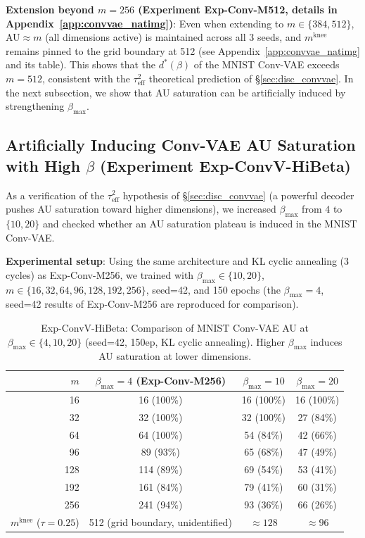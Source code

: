 \documentclass[make,article,submit,pdftex,moreauthors]{Definitions/mdpi}
\newcommand{\mknee}{m^{\mathrm{knee}}}
\begin{document}
\textbf{Extension beyond $m=256$ (Experiment Exp-Conv-M512, details in Appendix~\ref{app:convvae_natimg})}:
Even when extending to $m \in \{384, 512\}$, AU$\approx m$ (all dimensions active) is maintained across
all 3 seeds, and $\mknee$ remains pinned to the grid boundary at 512
(see Appendix~\ref{app:convvae_natimg} and its table).
This shows that the $d^*(\beta)$ of the MNIST Conv-VAE exceeds $m=512$,
consistent with the $\tau^2_\mathrm{eff}$ theoretical prediction of \S\ref{sec:disc_convvae}.
In the next subsection, we show that AU saturation can be artificially induced by strengthening $\beta_{\max}$.

\subsection{Artificially Inducing Conv-VAE AU Saturation with High $\beta$ (Experiment Exp-ConvV-HiBeta)}\label{sec:exp_hibeta}

As a verification of the $\tau^2_\mathrm{eff}$ hypothesis of \S\ref{sec:disc_convvae}
(a powerful decoder pushes AU saturation toward higher dimensions),
we increased $\beta_{\max}$ from $4$ to $\{10, 20\}$ and checked whether an AU saturation plateau
is induced in the MNIST Conv-VAE.

\textbf{Experimental setup}: Using the same architecture and KL cyclic annealing (3 cycles) as Exp-Conv-M256,
we trained with $\beta_{\max} \in \{10, 20\}$, $m \in \{16, 32, 64, 96, 128, 192, 256\}$,
seed=42, and 150 epochs (the $\beta_{\max}=4$, seed=42 results of Exp-Conv-M256 are reproduced for comparison).

\begin{table}[H]
\centering
\caption{Exp-ConvV-HiBeta: Comparison of MNIST Conv-VAE AU at $\beta_\mathrm{max} \in \{4, 10, 20\}$ (seed=42, 150ep, KL cyclic annealing). Higher $\beta_\mathrm{max}$ induces AU saturation at lower dimensions.}
\label{tab:hibeta}
\small
\begin{tabular}{r ccc}
\toprule
$m$ & $\beta_{\max}=4$ (Exp-Conv-M256) & $\beta_{\max}=10$ & $\beta_{\max}=20$ \\
\midrule
 16  & 16  (100\%)& 16 (100\%) & 16 (100\%) \\
 32  & 32  (100\%)& 32 (100\%) & 27 (84\%)  \\
 64  & 64  (100\%)& 54 (84\%)  & 42 (66\%)  \\
 96  & 89  (93\%) & 65 (68\%)  & 47 (49\%)  \\
128  & 114 (89\%) & 69 (54\%)  & 53 (41\%)  \\
192  & 161 (84\%) & 79 (41\%)  & 60 (31\%)  \\
256  & 241 (94\%) & 93 (36\%)  & 66 (26\%)  \\
\midrule
$\mknee$ ($\tau=0.25$) & 512 (grid boundary, unidentified) & $\approx 128$ & $\approx 96$ \\
\bottomrule
\end{tabular}
\end{table}
\end{document}
